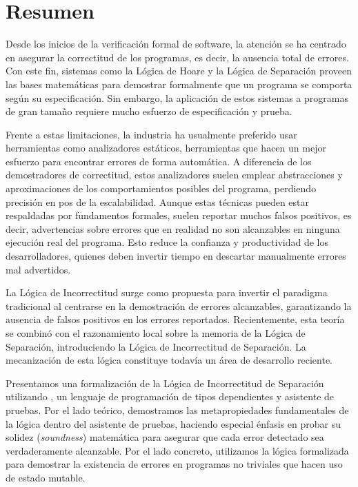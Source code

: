 \documentclass[a4paper,	11pt]{report}
\begin{document}
\titleGP
\newpage
\thispagestyle{empty}

\tableofcontents

\chapter*{Resumen}
Desde los inicios de la verificación formal de software, la atención se ha centrado en asegurar la correctitud de los programas, es decir, la ausencia total de errores.
Con este fin, sistemas como la Lógica de Hoare y la Lógica de Separación proveen las bases matemáticas para demostrar formalmente que un programa se comporta según su especificación.
Sin embargo, la aplicación de estos sistemas a programas de gran tamaño requiere mucho esfuerzo de especificación y prueba.

Frente a estas limitaciones, la industria ha usualmente preferido usar herramientas como analizadores estáticos, herramientas que hacen un mejor esfuerzo para encontrar errores de forma automática.
A diferencia de los demostradores de correctitud, estos analizadores suelen emplear abstracciones y aproximaciones de los comportamientos posibles del programa, perdiendo precisión en pos de la escalabilidad.
Aunque estas técnicas pueden estar respaldadas por fundamentos formales, suelen reportar muchos falsos positivos, es decir, advertencias sobre errores que en realidad no son alcanzables en ninguna ejecución real del programa.
Esto reduce la confianza y productividad de los desarrolladores, quienes deben invertir tiempo en descartar manualmente errores mal advertidos.

La Lógica de Incorrectitud surge como propuesta para invertir el paradigma tradicional al centrarse en la demostración de errores alcanzables,
garantizando la ausencia de falsos positivos en los errores reportados.
Recientemente, esta teoría se combinó con el razonamiento local sobre la memoria de la Lógica de Separación, introduciendo la Lógica de Incorrectitud de Separación.
La mecanización de esta lógica constituye todavía un área de desarrollo reciente.

Presentamos una formalización de la Lógica de Incorrectitud de Separación utilizando \fstar{}, un lenguaje de programación de tipos dependientes y asistente de pruebas.
Por el lado teórico, demostramos las metapropiedades fundamentales de la lógica dentro del asistente de pruebas, haciendo especial énfasis en probar su solidez (\textit{soundness}) matemática para asegurar que cada error detectado sea verdaderamente alcanzable.
Por el lado concreto, utilizamos la lógica formalizada para demostrar la existencia de errores en programas no triviales que hacen uso de estado mutable.
\end{document}
